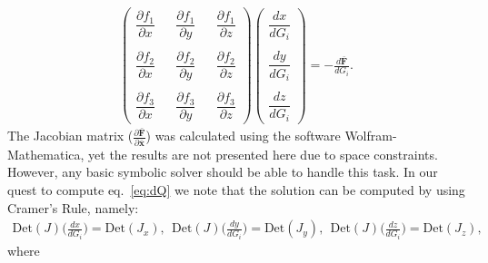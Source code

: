 \begin{align*}
\begin{pmatrix}
\dfrac{\partial f_1}{\partial x} && \dfrac{\partial f_1}{\partial y} && \dfrac{\partial f_1}{\partial z} \\
\\
\dfrac{\partial f_2}{\partial x} && \dfrac{\partial f_2}{\partial y} && \dfrac{\partial f_2}{\partial z} \\
\\
\dfrac{\partial f_3}{\partial x} && \dfrac{\partial f_3}{\partial y} && \dfrac{\partial f_3}{\partial z}
\end{pmatrix}
\begin{pmatrix}
\dfrac{d x}{d G_i}\\ 
\\
\dfrac{d y}{d G_i} \\
\\
\dfrac{d z}{d G_i}
\end{pmatrix} =
- \frac{d\bar{\textbf{F}}}{dG_i}.
\end{align*}
The Jacobian matrix ($\frac{\partial \bar{\textbf{F}}}{\partial \bar{\textbf{x}}}$) was calculated using the software Wolfram-Mathematica, yet the results are not presented here due to space constraints. However, any basic symbolic solver should be able to handle this task. In our quest to compute eq.~\eqref{eq:dQ} we note that the solution can be computed by using Cramer's Rule, namely: 
\begin{align*}
\text{Det}(J) \Big(\frac{d x}{d G_i} \Big)=\text{Det}(J_x),\ \ \text{Det}(J) \Big( \frac{d y}{dG_i} \Big)=\text{Det}(J_y), \ \ \text{Det}(J) \Big( \frac{d z}{dG_i} \Big) =\text{Det}(J_z),
\end{align*}
where
